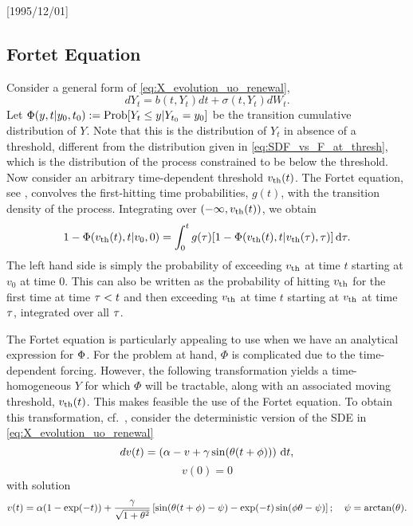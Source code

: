 \NeedsTeXFormat{LaTeX2e}[1995/12/01] \documentclass[10pt]{bmc_article}
\newenvironment{bmcformat}{\begin{raggedright}\baselineskip20pt\sloppy\setboolean{publ}{false}}{\end{raggedright}\baselineskip20pt\sloppy}
\begin{document}
\begin{bmcformat}
\subsection{Fortet Equation}
\label{sec:fortet_estimation}
Consider a general form of \cref{eq:X_evolution_uo_renewal}, $$ dY_t =
b(t,Y_t)dt + \sigma(t,Y_t) dW_t. $$ Let ${\Phi}(y,t| y_0, t_0) :=   \operatorname{Prob}[Y_t \leq
y| Y_{t_0} = y_0]$ be the transition cumulative distribution of $Y$. Note that
this is the distribution of $Y_t$ in absence of a threshold, different from the
distribution given in \cref{eq:SDF_vs_F_at_thresh},
 which is the distribution 
of the process constrained to be below the threshold. 
Now consider an arbitrary time-dependent threshold ${ v_{\textrm{th} } }(t)$. The Fortet
equation, see \cite{Fortet1943}, convolves the first-hitting time probabilities,
$g(t)$, with the transition density of the process. Integrating
over $(-\infty, { v_{\textrm{th} } }(t))$, we obtain
\begin{equation}
1 - {\Phi}({ v_{\textrm{th} } }(t), t|v_0, 0) =
\int_0^t g(\tau) [1-{\Phi} ({ v_{\textrm{th} } }(t),  t| { v_{\textrm{th} } }({\tau}), {\tau})] \, \mathrm{d} {\tau}.
\label{eq:Fortet_moving_vth}
\end{equation}
The left hand side is simply the probability of exceeding ${ v_{\textrm{th} } }$ at time
$t$ starting at $v_0$ at time $0$. This can also be written as the probability
of hitting ${ v_{\textrm{th} } }$ for the first time at time ${\tau} < t$ and then exceeding
${ v_{\textrm{th} } }$ at time $t$ starting at ${ v_{\textrm{th} } }$ at time ${\tau}$, integrated over all ${\tau}$.

The Fortet equation is particularly appealing to use when we have an analytical
expression for ${\Phi}$. For the problem at hand, $\Phi$ is complicated
due to the time-dependent forcing. However, the following transformation yields
a time-homogeneous $Y$ for which $\Phi$ will be tractable, along with an associated
moving threshold, ${ v_{\textrm{th} } }(t)$. This makes feasible
the use of the Fortet equation. To obtain this transformation, cf.\
\cite{Shimokawa1999}, consider the deterministic version of the SDE in
\cref{eq:X_evolution_uo_renewal} 
\begin{equation}
dv(t) = \left( {\alpha} - v + {\gamma } \sin({\theta} (t + \phi) ) \right) \, \mathrm{d} t,
\label{eq:LIF_deterministic}
\end{equation}
$$v(0) = 0
$$
with solution
\begin{equation}
v(t) = {\alpha}( 1- \exp(-t)) 
  + \frac{{\gamma }}{\sqrt{1+{\theta}^2}} 
\left[  \sin({\theta}(t + \phi) - \psi )
 - \exp(-t)\sin(\phi{\theta} - \psi ) \right]; \quad  
\psi = \arctan({\theta}).
\label{eq:LIF_deterministic_solution}
\end{equation}


\end{bmcformat}
\end{document}
